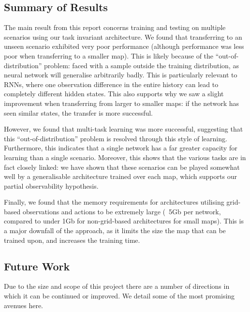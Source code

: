 \subsection{Summary of Results}

The main result from this report concerns training and testing on multiple scenarios using our task invariant architecture. We found that transferring to an unseen scenario exhibited very poor performance (although performance was less poor when transferring to a smaller map). This is likely because of the ``out-of-distribution'' \cite{ood} problem: faced with a sample outside the training distribution, as neural network will generalise arbitrarily badly. This is particularly relevant to RNNs, where one observation difference in the entire history can lead to completely different hidden states. This also supports why we saw a slight improvement when transferring from larger to smaller maps: if the network has seen similar states, the transfer is more successful.



However, we found that multi-task learning was more successful, suggesting that this ``out-of-distribution'' problem is resolved through this style of learning. Furthermore, this indicates that a single network has a far greater capacity for learning than a single scenario. Moreover, this shows that the various tasks are in fact closely linked: we have shown that these scenarios can be played somewhat well by a generalisable architecture trained over each map, which supports our partial observability hypothesis.



Finally, we found that the memory requirements for architectures utilising grid-based observations and actions to be extremely large (~5Gb per network, compared to under 1Gb for non-grid-based architectures for small maps). This is a major downfall of the approach, as it limits the size the map that can be trained upon, and increases the training time.





\subsection{Future Work}

Due to the size and scope of this project there are a number of directions in which it can be continued or improved. We detail some of the most promising avenues here.


